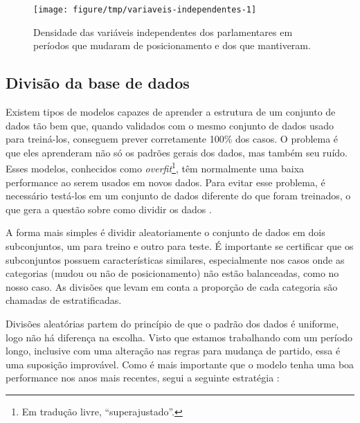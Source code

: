 \documentclass[a4paper,titlepage]{ppgi}\usepackage[]{graphicx}\usepackage[]{color}
\newenvironment{knitrout}{}{} %
\begin{document}
\begin{knitrout}
\color{fgcolor}\begin{figure}
\texttt{[image: figure/tmp/variaveis-independentes-1]} \caption[Densidade das variáveis independentes dos parlamentares em períodos que mudaram de posicionamento e dos que mantiveram]{Densidade das variáveis independentes dos parlamentares em períodos que mudaram de posicionamento e dos que mantiveram.}\label{fig:variaveis-independentes}
\end{figure}


\end{knitrout}

\subsection{Divisão da base de dados}
\label{cap:desenvolvimento:divisao-dados}


Existem tipos de modelos capazes de aprender a estrutura de um conjunto de
dados tão bem que, quando validados com o mesmo conjunto de dados usado para
treiná-los, conseguem prever corretamente 100\% dos casos. O problema é que
eles aprenderam não só os padrões gerais dos dados, mas também seu ruído. Esses
modelos, conhecidos como \emph{overfit}\footnote{Em tradução livre,
``superajustado''.}, têm normalmente uma baixa performance ao serem usados em
novos dados. Para evitar esse problema, é necessário testá-los em um conjunto
de dados diferente do que foram treinados, o que gera a questão sobre como
dividir os dados \cite{Kuhn2013}.

A forma mais simples é dividir aleatoriamente o conjunto de dados em dois
subconjuntos, um para treino e outro para teste. É importante se certificar que
os subconjuntos possuem características similares, especialmente nos casos onde
as categorias (mudou ou não de posicionamento) não estão balanceadas, como no
nosso caso. As divisões que levam em conta a proporção de cada categoria são
chamadas de estratificadas.

Divisões aleatórias partem do princípio de que o padrão dos dados é uniforme,
logo não há diferença na escolha. Visto que estamos trabalhando com um período
longo, inclusive com uma alteração nas regras para mudança de partido, essa é
uma suposição improvável. Como é mais importante que o modelo tenha uma boa
performance nos anos mais recentes, segui a seguinte estratégia \cite{Kuhn2013}:
\end{document}
